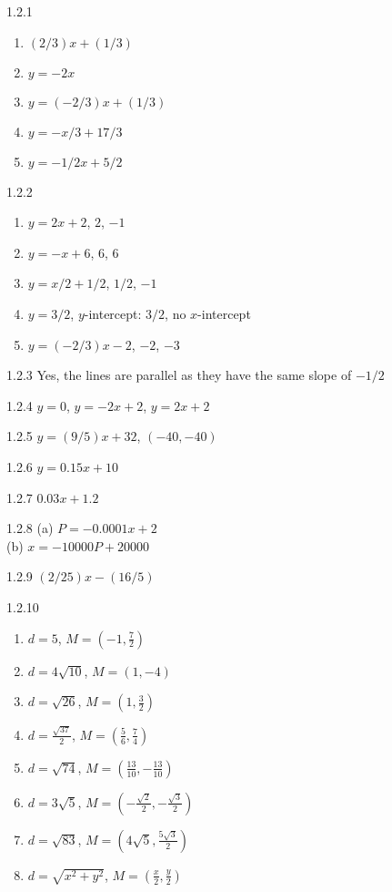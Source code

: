 \begin{Answer}{1.2.1}
\begin{enumerate}
	\item	$(2/3)x+(1/3)$
	\item	$y=-2x$
	\item	$y=(-2/3)x+(1/3)$
	\item	$y=-x/3+17/3$
	\item	$y=-1/2x+5/2$
\end{enumerate}
\end{Answer}
\begin{Answer}{1.2.2}
\begin{enumerate}
	\item	$y=2x+2$, $2$, $-1$
	\item	$y=-x+6$, $6$, $6$
	\item	$y=x/2+1/2$, $1/2$, $-1$
	\item	$y=3/2$, $y$-intercept: $3/2$, no $x$-intercept
	\item	$y=(-2/3)x-2$, $-2$, $-3$
\end{enumerate}
\end{Answer}
\begin{Answer}{1.2.3}
Yes, the lines are parallel as they have the same slope of $-1/2$
\end{Answer}
\begin{Answer}{1.2.4}
$y=0$, $y=-2x+2$, $y=2x+2$
\end{Answer}
\begin{Answer}{1.2.5}
$y=(9/5)x+32$, $(-40,-40)$
\end{Answer}
\begin{Answer}{1.2.6}
$y=0.15x+10$
\end{Answer}
\begin{Answer}{1.2.7}
$0.03x+1.2$
\end{Answer}
\begin{Answer}{1.2.8}
(a) $P=-0.0001x+2$\\
(b) $x=-10000P+20000$
\end{Answer}
\begin{Answer}{1.2.9}
$(2/25)x-(16/5)$
\end{Answer}
\begin{Answer}{1.2.10}
	\begin{enumerate}
\item $d = 5$, $M = \left(-1, \frac{7}{2} \right)$
\item $d = 4 \sqrt{10}$, $M = \left(1, -4 \right)$
\item $d = \sqrt{26}$, $M = \left(1, \frac{3}{2} \right)$
\item $d= \frac{\sqrt{37}}{2}$, $M = \left(\frac{5}{6}, \frac{7}{4} \right)$
\item  $d = \sqrt{74}$, $M = \left(\frac{13}{10}, -\frac{13}{10} \right)$ 
\item $d= 3\sqrt{5}$, $M = \left(-\frac{\sqrt{2}}{2}, -\frac{\sqrt{3}}{2} \right)$
\item  $d = \sqrt{83}$, $M = \left(4 \sqrt{5}, \frac{5 \sqrt{3}}{2} \right)$
\item $d = \sqrt{x^2 + y^2}$, $M = \left( \frac{x}{2}, \frac{y}{2}\right)$ 
\end{enumerate}
\end{Answer}
